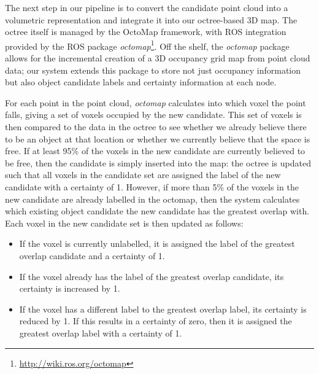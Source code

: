 The next step in our pipeline is to convert the candidate point cloud into a volumetric representation and integrate it into our octree-based 3D map.
The octree itself is managed by the OctoMap framework\cite{hornung13octomap}, with ROS integration provided by the ROS package \textit{octomap}\footnote{\url{http://wiki.ros.org/octomap}}.
Off the shelf, the \textit{octomap} package allows for the incremental creation of a 3D occupancy grid map from point cloud data; our system extends this package to store not just occupancy information but also object candidate labels and certainty information at each node.


For each point in the point cloud, \textit{octomap} calculates into which voxel the point falls, giving a set of voxels occupied by the new candidate.
This set of voxels is then compared to the data in the octree to see whether we already believe there to be an object at that location or whether we currently believe that the space is free.
If at least 95\% of the voxels in the new candidate are currently believed to be free, then the candidate is simply inserted into the map: the octree is updated such that all voxels in the candidate set are assigned the label of the new candidate with a certainty of \num{1}.
However, if more than 5\% of the voxels in the new candidate are already labelled in the octomap, then the system calculates which existing object candidate the new candidate has the greatest overlap with.
Each voxel in the new candidate set is then updated as follows:

\begin{itemize}
	\item If the voxel is currently unlabelled, it is assigned the label of the greatest overlap candidate and a certainty of \num{1}.
	\item If the voxel already has the label of the greatest overlap candidate, its certainty is increased by \num{1}.
	\item If the voxel has a different label to the greatest overlap label, its certainty is reduced by \num{1}. If this results in a certainty of zero, then it is assigned the greatest overlap label with a certainty of \num{1}.
\end{itemize}
